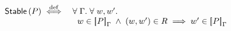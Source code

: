 %
%
\begin{definition}[Stability]
\[	
\begin{array}{r l}
	\stable{P} \iffdef &
	\for{\lenv}\for{w, w'} \\
	& \hspace*{0.2cm} w \in \sem[\lenv]{P} \;\land\; (w, w') \in \rely \implies
	 w' \in \sem[\lenv]{P}
\end{array}
\]
\end{definition}
